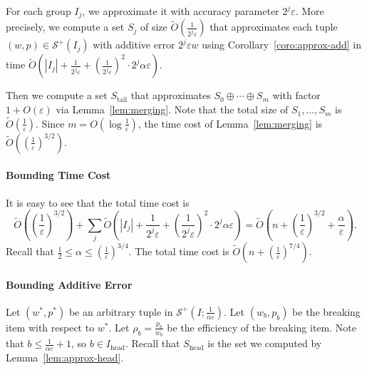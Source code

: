 \documentclass[a4paper,UKenglish,cleveref, autoref, thm-restate, pdfa]{lipics-v2021}
\newcommand{\eps}{\varepsilon}
\renewcommand{\leq}{\leqslant}
\begin{document}
For each group $I_j$, we approximate it with accuracy parameter $2^j\eps$.  More precisely, we compute a set $S_j$ of size $\tilde{O}(\frac{1}{2^j\eps})$ that approximates each tuple $(w, p) \in \mathcal{S}^+(I_j)$ with additive error $2^j\eps w$ using Corollary~\ref{coro:approx-add} in time $\tilde{O}(|I_j| + \frac{1}{2^j\eps} + (\frac{1}{2^j\eps})^2 \cdot 2^j \alpha\eps)$.

Then we compute a set $S_{\mathrm{tail}}$ that approximates $S_0 \oplus \cdots \oplus S_m$ with factor $1 + O(\eps)$ via Lemma~\ref{lem:merging}. Note that the total size of $S_1, \ldots, S_m$ is $\tilde{O}(\frac{1}{\eps})$.  Since $m = O(\log \frac{1}{\eps})$, the time cost of Lemma~\ref{lem:merging} is $\tilde{O}((\frac{1}{\eps})^{3/2})$.

\paragraph*{Bounding Time Cost}
It is easy to see that the total time cost is 
\[
    \tilde{O}((\frac{1}{\eps})^{3/2}) + \sum_{j} \tilde{O}(|I_j| + \frac{1}{2^j\eps} + (\frac{1}{2^j\eps})^2 \cdot 2^j \alpha\eps) = \tilde{O}(n + (\frac{1}{\eps})^{3/2} + \frac{\alpha}{\eps}).
\]
Recall that $\frac{1}{2}\leq \alpha\leq (\frac{1}{\eps})^{3/4}$. The total time cost is $\tilde{O}(n + (\frac{1}{\eps})^{7/4})$.

\paragraph*{Bounding Additive Error}
Let $(w^*, p^*)$ be an arbitrary tuple in $\mathcal{S}^+(I; \frac{1}{\alpha\eps})$. Let $(w_b, p_b)$ be the breaking item with respect to $w^*$. Let $\rho_b = \frac{p_b}{w_b}$ be the efficiency of the breaking item. Note that $b \leq \frac{1}{\alpha\eps} + 1$, so $b \in I_{\mathrm{head}}$. Recall that $S_{\mathrm{head}}$ is the set we computed by Lemma~\ref{lem:approx-head}.
\end{document}
